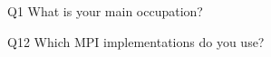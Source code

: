\begin{description}%
\item{Q1} What is your main occupation?%
\item{Q12} Which MPI implementations do you use?%
\end{description}%
